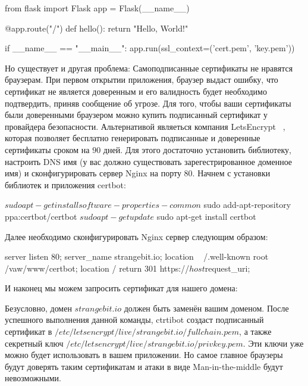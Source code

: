 \begin{python}
from flask import Flask
app = Flask(__name__)

@app.route("/")
def hello():
    return "Hello, World!"

if __name__ == "__main__":
    app.run(ssl_context=('cert.pem', 'key.pem'))
\end{python}

Но существует и другая проблема: Самоподписанные сертификаты не нравятся браузерам.
При первом открытии приложения, браузер выдаст ошибку, что сертификат не является
доверенным и его валидность будет необходимо подтвердить, приняв сообщение об угрозе.
Для того, чтобы ваши сертификаты были доверенными браузером можно купить подписанный 
сертификат у провайдера безопасности. Альтернативой являеться компания LetsEncrypt
~\cite{letsencrypt}, которая позволяет бесплатно генерировать подписанные и доверенные сертификаты
сроком на $90$ дней. Для этого достаточно установить библиотеку, настроить DNS
имя (у вас должно существовать зарегестрированное доменное имя) и сконфигурировать 
сервер Nginx на порту $80$. Начнем с установки библиотек и приложения certbot:

\begin{python}
$ sudo apt-get install software-properties-common
$ sudo add-apt-repository ppa:certbot/certbot
$ sudo apt-get update
$ sudo apt-get install certbot
\end{python}

Далее необходимо сконфигурировать Nginx сервер следующим образом:

\begin{python}
server {
    listen 80;
    server_name strangebit.io;
    location ~ /.well-known {
        root /vaw/www/certbot;
    }
    location / {
        return 301 https://$host$request_uri;
    }
}
\end{python}

И наконец мы можем запросить сертификат для нашего домена:


Безусловно, домен $strangebit.io$ должен быть заменён вашим доменом. После 
успешного выполнения данной команды, ctrtibot создаст подписанный сертификат в 
$/etc/letsencrypt/live/strangebit.io/fullchain.pem$, а также секретный ключ
$/etc/letsencrypt/live/strangebit.io/privkey.pem$. Эти ключи уже можно будет 
использовать в вашем приложении. Но самое главное браузеры будут доверять 
таким сертификатам и атаки в виде Man-in-the-middle будут невозможными.

